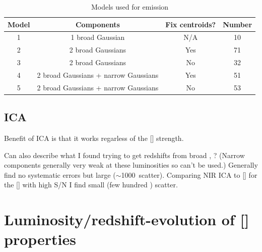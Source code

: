 \begin{table}
  \centering
  \small 
  \caption{Models used for \ha emission}
  \label{tab:hamod}
    \begin{tabular}{cccc} 
    \hline
    Model     & Components & Fix centroids? & Number \\
    \hline
    1        & 1 broad Gaussian  & N/A &  10 \\
    2        & 2 broad Gaussians & Yes &  71 \\
    3        & 2 broad Gaussians & No  &  32 \\
    4        & 2 broad Gaussians + narrow Gaussians & Yes & 51 \\
    5        & 2 broad Gaussians + narrow Gaussians & No  & 53 \\
    \hline
    \end{tabular}
\end{table} 

\subsection{\ac{ICA}}

Benefit of \ac{ICA} is that it works regarless of the [] strength. 

Can also describe what I found trying to get redshifts from broad \hans, \hbns? (Narrow components generally very weak at these luminosities so can't be used.)
Generally find no systematic errors but large ($\sim$1000\kms\, scatter).
Comparing NIR \ac{ICA} to [] for the [] with high \ac{S/N} I find small (few hundred \kms) scatter. 

\section{Luminosity/redshift-evolution of [] properties}

